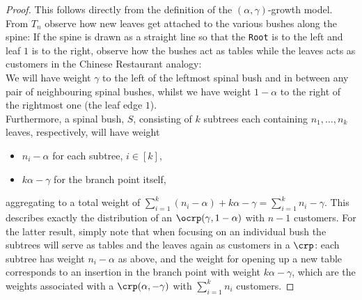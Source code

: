 \begin{proof}
  This follows directly from the definition of the $(\alpha, \gamma)$-growth model.
  From $T_n$ observe how new leaves get attached to the various bushes along the spine:
  If the spine is drawn as a straight line so that the \verb|Root| is to the left and leaf $1$ is to the right, observe how the bushes act as tables while the leaves acts as customers in the Chinese Restaurant analogy: \\
  We will have weight $\gamma$ to the left of the leftmost spinal bush and in between any pair of neighbouring spinal bushes, whilst we have weight $1-\alpha$ to the right of the rightmost one (the leaf edge $1$). \\
  Furthermore, a spinal bush, $S$, consisting of $k$ subtrees each containing $n_1, \ldots, n_k$ leaves, respectively, will have weight
  \begin{itemize}
    \item $n_i - \alpha$ for each subtree, $i \in [k]$,
    \item $k\alpha - \gamma$ for the branch point itself,
  \end{itemize}
  aggregating to a total weight of $\sum_{i=1}^{k}\left( n_i - \alpha \right) + k\alpha - \gamma = \sum_{i=1}^{k}n_i - \gamma$.
  This describes exactly the distribution of an $\ocrp(\gamma, 1-\alpha)$ with $n-1$ customers.
  For the latter result, simply note that when focusing on an individual bush the subtrees will serve as tables and the leaves again as customers in a $\crp$:
  each subtree has weight $n_i - \alpha$ as above, and the weight for opening up a new table corresponds to an insertion in the branch point with weight $k\alpha - \gamma$, which are the weights associated with a $\crp(\alpha, -\gamma)$ with $\sum_{i=1}^{k}n_i$ customers.
\end{proof}

